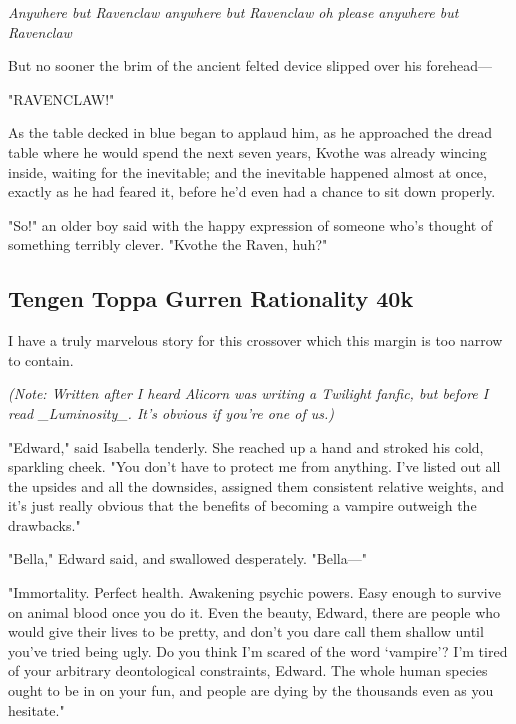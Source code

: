 \emph{Anywhere but Ravenclaw anywhere but Ravenclaw oh please anywhere but
Ravenclaw{\el}}

But no sooner the brim of the ancient felted device slipped over his forehead---

"RAVENCLAW!"

As the table decked in blue began to applaud him, as he approached the dread
table where he would spend the next seven years, Kvothe was already wincing
inside, waiting for the inevitable; and the inevitable happened almost at once,
exactly as he had feared it, before he'd even had a chance to sit down properly.

"So!" an older boy said with the happy expression of someone who's thought of
something terribly clever. "Kvothe the Raven, huh?"

\sbreak%
\subsection{Tengen Toppa Gurren Rationality 40k}
I have a truly marvelous story for this crossover which this margin is too
narrow to contain.
\sbreak%

\emph{(Note: Written after I heard Alicorn was writing a Twilight fanfic, but
before I read \_Luminosity\_. It's obvious if you're one of us.)}

\noindent{}"Edward," said Isabella tenderly. She reached up a hand and stroked his cold,
sparkling cheek. "You don't have to protect me from anything. I've listed out
all the upsides and all the downsides, assigned them consistent relative
weights, and it's just really obvious that the benefits of becoming a vampire
outweigh the drawbacks."

"Bella," Edward said, and swallowed desperately. "Bella---"

"Immortality. Perfect health. Awakening psychic powers. Easy enough to survive
on animal blood once you do it. Even the beauty, Edward, there are people who
would give their lives to be pretty, and don't you dare call them shallow until
you've tried being ugly. Do you think I'm scared of the word `vampire'? I'm
tired of your arbitrary deontological constraints, Edward. The whole human
species ought to be in on your fun, and people are dying by the thousands even
as you hesitate."

